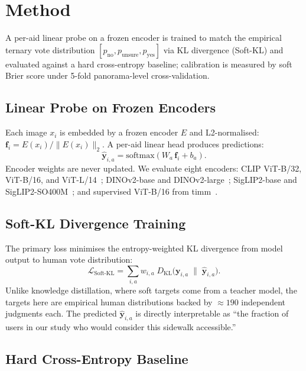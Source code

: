 \documentclass{article}
\newcommand{\kl}{D_{\mathrm{KL}}}
\begin{document}
\FloatBarrier
\section{Method}
\label{sec:method}

A per-aid linear probe on a frozen encoder is trained to match the empirical ternary vote distribution $[p_{\mathrm{no}}, p_{\mathrm{unsure}}, p_{\mathrm{yes}}]$ via KL divergence (Soft-KL) and evaluated against a hard cross-entropy baseline; calibration is measured by soft Brier score under 5-fold panorama-level cross-validation.

\subsection{Linear Probe on Frozen Encoders}

Each image $x_i$ is embedded by a frozen encoder $E$ and L2-normalised: $\mathbf{f}_i = E(x_i)/\|E(x_i)\|_2$. A per-aid linear head produces predictions:
\begin{equation}
\hat{\mathbf{y}}_{i,a} = \mathrm{softmax}(W_a\,\mathbf{f}_i + b_a). \end{equation}
Encoder weights are never updated. We evaluate eight encoders: CLIP ViT-B/32, ViT-B/16, and ViT-L/14~\citep{radford2021learningtransferablevisualmodels}; DINOv2-base and DINOv2-large~\citep{oquab2023dinov2}; SigLIP2-base and SigLIP2-SO400M~\citep{tschannen2025siglip2}; and supervised ViT-B/16 from timm~\citep{dosovitskiy2021an}.

\subsection{Soft-KL Divergence Training}
\label{sec:method:softkl}

The primary loss minimises the entropy-weighted KL divergence from model output to human vote distribution:
\begin{equation}
\mathcal{L}_{\mathrm{Soft\text{-}KL}} = \sum_{i,a} w_{i,a}\;\kl\!\bigl(\mathbf{y}_{i,a} \;\|\; \hat{\mathbf{y}}_{i,a}\bigr).
\label{eq:softkl}
\end{equation}
Unlike knowledge distillation, where soft targets come from a teacher model, the targets here are empirical human distributions backed by $\approx 190$ independent judgments each. The predicted $\hat{\mathbf{y}}_{i,a}$ is directly interpretable as ``the fraction of users in our study who would consider this sidewalk accessible.''

\subsection{Hard Cross-Entropy Baseline}
\label{sec:method:hardce}
\end{document}

